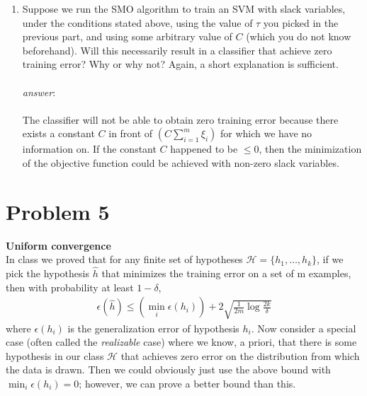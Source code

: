 \documentclass{article}
\begin{document}
\begin{enumerate}[label=(\alph*)]
\item Suppose we run the SMO algorithm to train an SVM with slack variables, under the conditions stated above, using the value of $\tau$ you picked in the previous part, and using some arbitrary value of $C$ (which you do not know beforehand). Will this necessarily result in a classifier that achieve zero training error? Why or why not? Again, a short explanation is sufficient.\\\\
\textit{answer}: \\\\
The classifier will not be able to obtain zero training error because there exists a constant $C$ in front of $(C\sum_{i=1}^{m}\xi_i)$ for which we have no information on. If the constant $C$ happened to be $\leq 0$, then the minimization of the objective function could be achieved with non-zero slack variables.
\end{enumerate}
\section{Problem 5}
\textbf{Uniform convergence}\\
In class we proved that for any finite set of hypotheses $\mathcal{H} = \{h_1,\dots, h_k\}$, if we pick the hypothesis $\hat{h}$ that minimizes the training error on a set of m examples, then with probability at least $1-\delta$,\begin{align*}
    \epsilon(\hat{h})\leq \left(\min_{i}\epsilon(h_i)\right)+2\sqrt{\frac{1}{2m}\log\frac{2k}{\delta}}
\end{align*}where $\epsilon(h_i)$ is the generalization error of hypothesis $h_i$. Now consider a special case (often called the \textit{realizable} case) where we know, a priori, that there is some hypothesis in our class $\mathcal{H}$ that achieves zero error on the distribution from which the data is drawn. Then we could obviously just use the above bound with $\min_i\epsilon(h_i)=0$; however, we can prove a better bound than this.
\end{document}
